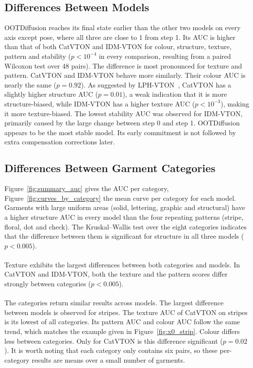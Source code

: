 \subsection{Differences Between Models}
OOTDiffusion reaches its final state earlier than the other two models on every axis except pose, where all three are close to 1 from step 1. Its AUC is higher than that of both CatVTON and IDM-VTON for colour, structure, texture, pattern and stability ($p < 10^{-4}$ in every comparison, resulting from a paired Wilcoxon test over 48 pairs). The difference is most pronounced for texture and pattern. CatVTON and IDM-VTON behave more similarly. Their colour AUC is nearly the same ($p = 0.92$). As suggested by LPH-VTON~\cite{liu2026lphvton}, CatVTON has a slightly higher structure AUC ($p = 0.01$), a weak indication that it is more structure-biased, while IDM-VTON has a higher texture AUC ($p < 10^{-3}$), making it more texture-biased. The lowest stability AUC was observed for IDM-VTON, primarily caused by the large change between step 0 and step 1. OOTDiffusion appears to be the most stable model. Its early commitment is not followed by extra compensation corrections later.

\subsection{Differences Between Garment Categories}
Figure~\ref{fig:summary_auc} gives the AUC per category, Figure~\ref{fig:curves_by_category} the mean curve per category for each model. Garments with large uniform areas (solid, lettering, graphic and structural) have a higher structure AUC in every model than the four repeating patterns (stripe, floral, dot and check). The Kruskal--Wallis test over the eight categories indicates that the difference between them is significant for structure in all three models ($p < 0.005$).
\\ \\
Texture exhibits the largest differences between both categories and models. In CatVTON and IDM-VTON, both the texture and the pattern scores differ strongly between categories ($p < 0.005$).
\\ \\
The categories return similar results across models. The largest difference between models is observed for stripes. The texture AUC of CatVTON on stripes is its lowest of all categories. Its pattern AUC and colour AUC follow the same trend, which matches the example given in Figure~\ref{fig:x0_strip}. Colour differs less between categories. Only for CatVTON is this difference significant ($p = 0.02$). It is worth noting that each category only contains six pairs, so these per-category results are means over a small number of garments.

